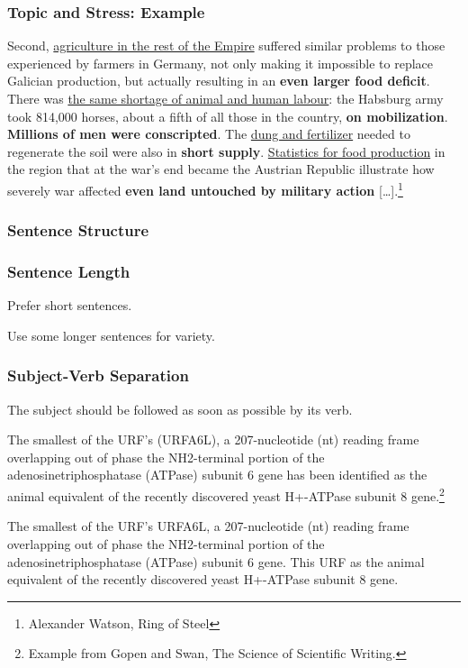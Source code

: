 \begin{frame}
  \frametitle{Topic and Stress: Example}

  \small
  Second, \underline{agriculture in the rest of the Empire} suffered similar problems to those experienced by farmers in Germany, not only making it impossible to replace Galician production, but actually resulting in an \textbf{even larger food deficit}.
  There was \underline{the same shortage of animal and human labour}: the Habsburg army took 814,000 horses, about a fifth of all those in the country, \textbf{on mobilization}.
  \textbf{Millions of men were conscripted}.
  The \underline{dung and fertilizer} needed to regenerate the soil were also in \textbf{short supply}.
  \underline{Statistics for food production} in the region that at the war's end became the Austrian Republic illustrate how severely war affected \textbf{even land untouched by military action} [\dots].\footnote{Alexander Watson, Ring of Steel}
\end{frame}


\subsubsection{Sentence Structure}

\begin{frame}
  \frametitle{Sentence Length}

  Prefer short sentences.

  \medskip

  Use some longer sentences for variety.
\end{frame}

\begin{frame}
  \frametitle{Subject-Verb Separation}

  The subject should be followed as soon as possible by its verb.

  \medskip
  \pause


  {
    \small
    The smallest of the URF's (URFA6L), a 207-nucleotide (nt) reading frame overlapping out of phase the NH2-terminal portion of the adenosinetriphosphatase (ATPase) subunit 6 gene has been identified as the animal equivalent of the recently discovered yeast H+-ATPase subunit 8 gene.\footnote{Example from Gopen and Swan, The Science of Scientific Writing.}
  }

  \medskip
  \pause


  {
    \small
    The smallest of the URF's  URFA6L, a 207-nucleotide (nt) reading frame overlapping out of phase the NH2-terminal portion of the adenosinetriphosphatase (ATPase) subunit 6 gene.
    This URF  as the animal equivalent of the recently discovered yeast H+-ATPase subunit 8 gene.
  }
\end{frame}

